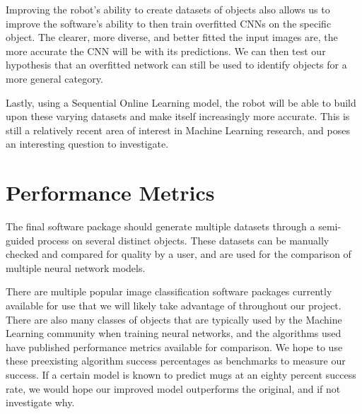 \documentclass[a4paper, 10pt]{article}
\begin{document}
Improving the robot's ability to create datasets of objects also allows us to improve the software's ability to then train overfitted CNNs on the specific object. The clearer, more diverse, and better fitted the input images are, the more accurate the CNN will be with its predictions. We can then test our hypothesis that an overfitted network can still be used to identify objects for a more general category.

Lastly, using a Sequential Online Learning model, the robot will be able to build upon these varying datasets and make itself increasingly more accurate. This is still a relatively recent area of interest in Machine Learning research, and poses an interesting question to investigate. 

\section{Performance Metrics}
The final software package should generate multiple datasets through a semi-guided process on several distinct objects. These datasets can be manually checked and compared for quality by a user, and are used for the comparison of multiple neural network models. 

There are multiple popular image classification software packages currently available for use that we will likely take advantage of throughout our project. There are also many classes of objects that are typically used by the Machine Learning community when training neural networks, and the algorithms used have published performance metrics available for comparison. We hope to use these preexisting algorithm success percentages as benchmarks to measure our success. If a certain model is known to predict mugs at an eighty percent success rate, we would hope our improved model outperforms the original, and if not investigate why. 
\end{document}
